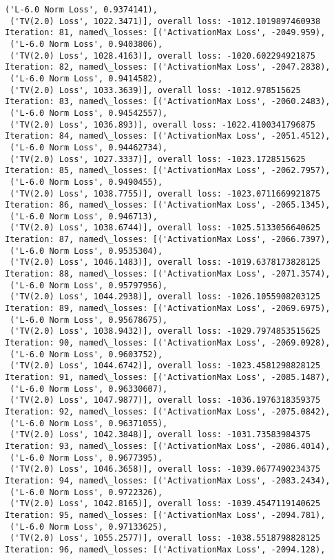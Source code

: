 \documentclass[10pt]{article}
\begin{document}
\begin{Verbatim}[commandchars=\\\{\}]
 ('L-6.0 Norm Loss', 0.9374141),
 ('TV(2.0) Loss', 1022.3471)], overall loss: -1012.1019897460938
Iteration: 81, named\_losses: [('ActivationMax Loss', -2049.959),
 ('L-6.0 Norm Loss', 0.9403806),
 ('TV(2.0) Loss', 1028.4163)], overall loss: -1020.602294921875
Iteration: 82, named\_losses: [('ActivationMax Loss', -2047.2838),
 ('L-6.0 Norm Loss', 0.9414582),
 ('TV(2.0) Loss', 1033.3639)], overall loss: -1012.978515625
Iteration: 83, named\_losses: [('ActivationMax Loss', -2060.2483),
 ('L-6.0 Norm Loss', 0.94542557),
 ('TV(2.0) Loss', 1036.893)], overall loss: -1022.4100341796875
Iteration: 84, named\_losses: [('ActivationMax Loss', -2051.4512),
 ('L-6.0 Norm Loss', 0.94462734),
 ('TV(2.0) Loss', 1027.3337)], overall loss: -1023.1728515625
Iteration: 85, named\_losses: [('ActivationMax Loss', -2062.7957),
 ('L-6.0 Norm Loss', 0.9490455),
 ('TV(2.0) Loss', 1038.7755)], overall loss: -1023.0711669921875
Iteration: 86, named\_losses: [('ActivationMax Loss', -2065.1345),
 ('L-6.0 Norm Loss', 0.946713),
 ('TV(2.0) Loss', 1038.6744)], overall loss: -1025.5133056640625
Iteration: 87, named\_losses: [('ActivationMax Loss', -2066.7397),
 ('L-6.0 Norm Loss', 0.9535304),
 ('TV(2.0) Loss', 1046.1483)], overall loss: -1019.6378173828125
Iteration: 88, named\_losses: [('ActivationMax Loss', -2071.3574),
 ('L-6.0 Norm Loss', 0.95797956),
 ('TV(2.0) Loss', 1044.2938)], overall loss: -1026.1055908203125
Iteration: 89, named\_losses: [('ActivationMax Loss', -2069.6975),
 ('L-6.0 Norm Loss', 0.95678675),
 ('TV(2.0) Loss', 1038.9432)], overall loss: -1029.7974853515625
Iteration: 90, named\_losses: [('ActivationMax Loss', -2069.0928),
 ('L-6.0 Norm Loss', 0.9603752),
 ('TV(2.0) Loss', 1044.6742)], overall loss: -1023.4581298828125
Iteration: 91, named\_losses: [('ActivationMax Loss', -2085.1487),
 ('L-6.0 Norm Loss', 0.96330607),
 ('TV(2.0) Loss', 1047.9877)], overall loss: -1036.1976318359375
Iteration: 92, named\_losses: [('ActivationMax Loss', -2075.0842),
 ('L-6.0 Norm Loss', 0.96371055),
 ('TV(2.0) Loss', 1042.3848)], overall loss: -1031.73583984375
Iteration: 93, named\_losses: [('ActivationMax Loss', -2086.4014),
 ('L-6.0 Norm Loss', 0.9677395),
 ('TV(2.0) Loss', 1046.3658)], overall loss: -1039.0677490234375
Iteration: 94, named\_losses: [('ActivationMax Loss', -2083.2434),
 ('L-6.0 Norm Loss', 0.9722326),
 ('TV(2.0) Loss', 1042.8165)], overall loss: -1039.4547119140625
Iteration: 95, named\_losses: [('ActivationMax Loss', -2094.781),
 ('L-6.0 Norm Loss', 0.97133625),
 ('TV(2.0) Loss', 1055.2577)], overall loss: -1038.5518798828125
Iteration: 96, named\_losses: [('ActivationMax Loss', -2094.128),

\end{Verbatim}
\end{document}
